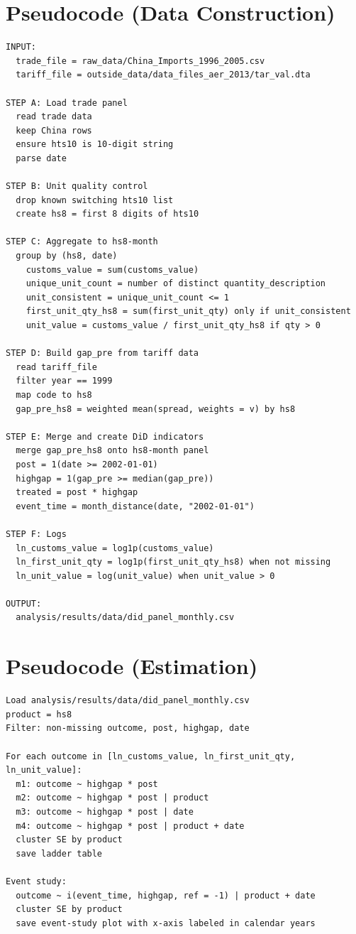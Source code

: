 \documentclass[11pt]{article}
\begin{document}
\section{Pseudocode (Data Construction)}
\begin{verbatim}
INPUT:
  trade_file = raw_data/China_Imports_1996_2005.csv
  tariff_file = outside_data/data_files_aer_2013/tar_val.dta

STEP A: Load trade panel
  read trade data
  keep China rows
  ensure hts10 is 10-digit string
  parse date

STEP B: Unit quality control
  drop known switching hts10 list
  create hs8 = first 8 digits of hts10

STEP C: Aggregate to hs8-month
  group by (hs8, date)
    customs_value = sum(customs_value)
    unique_unit_count = number of distinct quantity_description
    unit_consistent = unique_unit_count <= 1
    first_unit_qty_hs8 = sum(first_unit_qty) only if unit_consistent
    unit_value = customs_value / first_unit_qty_hs8 if qty > 0

STEP D: Build gap_pre from tariff data
  read tariff_file
  filter year == 1999
  map code to hs8
  gap_pre_hs8 = weighted mean(spread, weights = v) by hs8

STEP E: Merge and create DiD indicators
  merge gap_pre_hs8 onto hs8-month panel
  post = 1(date >= 2002-01-01)
  highgap = 1(gap_pre >= median(gap_pre))
  treated = post * highgap
  event_time = month_distance(date, "2002-01-01")

STEP F: Logs
  ln_customs_value = log1p(customs_value)
  ln_first_unit_qty = log1p(first_unit_qty_hs8) when not missing
  ln_unit_value = log(unit_value) when unit_value > 0

OUTPUT:
  analysis/results/data/did_panel_monthly.csv
\end{verbatim}

\section{Pseudocode (Estimation)}
\begin{verbatim}
Load analysis/results/data/did_panel_monthly.csv
product = hs8
Filter: non-missing outcome, post, highgap, date

For each outcome in [ln_customs_value, ln_first_unit_qty, ln_unit_value]:
  m1: outcome ~ highgap * post
  m2: outcome ~ highgap * post | product
  m3: outcome ~ highgap * post | date
  m4: outcome ~ highgap * post | product + date
  cluster SE by product
  save ladder table

Event study:
  outcome ~ i(event_time, highgap, ref = -1) | product + date
  cluster SE by product
  save event-study plot with x-axis labeled in calendar years
\end{verbatim}
\end{document}

